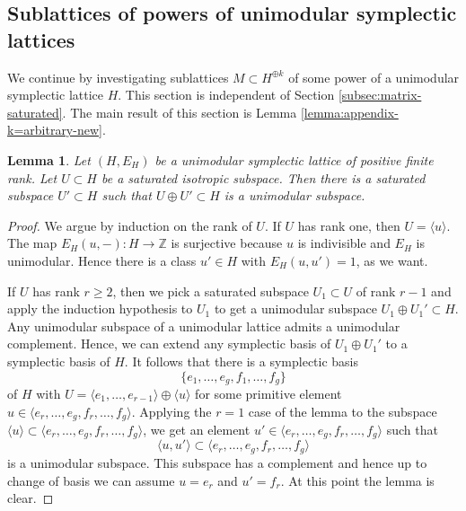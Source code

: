 \documentclass[a4paper,11pt,reqno]{amsart}
\numberwithin{equation}{section}
\theoremstyle{plain}
\newtheorem{lemma}[theorem]{Lemma}
\theoremstyle{definition}
\newcommand{\Z}{\mathbb Z}
\begin{document}
\subsection{Sublattices of powers of unimodular symplectic lattices} \label{subsection:sublattices-of-powers}

We continue by investigating sublattices $M \subset H^{\oplus k}$ of some power of a unimodular symplectic lattice $H$. This section is independent of Section \ref{subsec:matrix-saturated}. The main result of this section is Lemma \ref{lemma:appendix-k=arbitrary-new}. 

\begin{lemma}\label{lem:isotropic-subspace}
Let $(H,E_H)$ be a unimodular symplectic lattice of positive finite rank. 
Let $U\subset H$ be a saturated isotropic subspace.
Then there is a saturated subspace $U'\subset H$ such that $U\oplus U'\subset H$ is a unimodular subspace.
\end{lemma}
\begin{proof}
We argue by induction on the rank of $U$.
If $U$ has rank one, then $U=\langle u\rangle $.
The map $E_H(u,-):H\to \Z$ is surjective because $u$ is indivisible and $E_H$ is unimodular.
Hence there is a class $u'\in H$ with $E_H(u,u')=1$, as we want.

 If $U$ has rank $r\geq 2$, then we pick a saturated subspace $U_1\subset U$ of rank $r-1$ and apply the induction hypothesis to $U_1$ to get a unimodular subspace $U_1\oplus U_1'\subset H$.
 Any unimodular subspace of a unimodular lattice admits a unimodular complement.
 Hence, we can extend any symplectic basis of $U_1\oplus U_1'$ to a symplectic basis of $H$.
 It follows that there is a symplectic basis
 $$
\{  e_1,\dots ,e_g,f_1,\dots ,f_g \}
$$
of $H$ with $U=\langle e_1,\dots ,e_{r-1}\rangle\oplus \langle u\rangle  $ for some primitive element
$
u\in \langle e_r,\dots ,e_{g},f_r,\dots ,f_g\rangle .
$
Applying the $r=1$ case of the lemma to the subspace $ \langle u\rangle\subset \langle e_r,\dots ,e_{g},f_r,\dots ,f_g\rangle $, we get
 an element $u'\in  \langle e_r,\dots ,e_{g},f_r,\dots ,f_g\rangle $ such that $$ 
\langle u,u'\rangle\subset  \langle e_r,\dots ,e_{g},f_r,\dots ,f_g\rangle $$
is a unimodular subspace.  
This subspace has a complement and hence up to change of basis we can assume $u=e_r$ and $u'=f_r$.
At this point the lemma is clear.
\end{proof}
\end{document}
